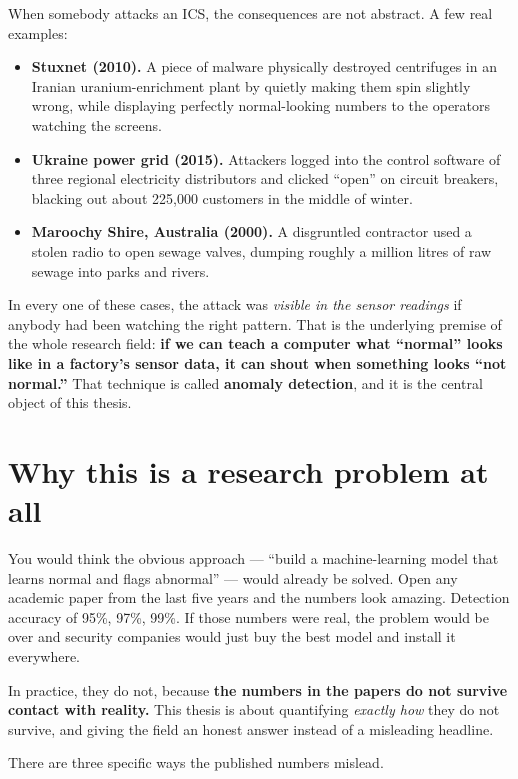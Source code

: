 \documentclass[11pt,a4paper]{article}
\begin{document}
When somebody attacks an ICS, the consequences are not abstract. A few real examples:

\begin{itemize}
  \item \textbf{Stuxnet (2010).} A piece of malware physically destroyed centrifuges in an Iranian uranium-enrichment plant by quietly making them spin slightly wrong, while displaying perfectly normal-looking numbers to the operators watching the screens.
  \item \textbf{Ukraine power grid (2015).} Attackers logged into the control software of three regional electricity distributors and clicked ``open'' on circuit breakers, blacking out about 225{,}000 customers in the middle of winter.
  \item \textbf{Maroochy Shire, Australia (2000).} A disgruntled contractor used a stolen radio to open sewage valves, dumping roughly a million litres of raw sewage into parks and rivers.
\end{itemize}

In every one of these cases, the attack was \emph{visible in the sensor readings} if anybody had been watching the right pattern. That is the underlying premise of the whole research field: \textbf{if we can teach a computer what ``normal'' looks like in a factory's sensor data, it can shout when something looks ``not normal.''} That technique is called \textbf{anomaly detection}, and it is the central object of this thesis.

\section{Why this is a research problem at all}

You would think the obvious approach --- ``build a machine-learning model that learns normal and flags abnormal'' --- would already be solved. Open any academic paper from the last five years and the numbers look amazing. Detection accuracy of 95\%, 97\%, 99\%. If those numbers were real, the problem would be over and security companies would just buy the best model and install it everywhere.

In practice, they do not, because \textbf{the numbers in the papers do not survive contact with reality.} This thesis is about quantifying \emph{exactly how} they do not survive, and giving the field an honest answer instead of a misleading headline.

There are three specific ways the published numbers mislead.
\end{document}
